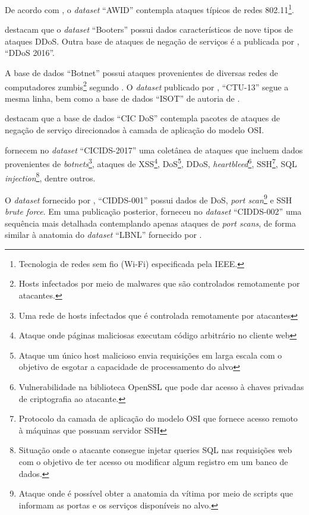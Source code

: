 De acordo com , o \textit{dataset} ``AWID'' contempla ataques típicos de redes 802.11\footnote{Tecnologia de redes sem fio (Wi-Fi) especificada pela IEEE.}.

 destacam que o \textit{dataset} ``Booters'' possui dados característicos de nove tipos de ataques DDoS. Outra base de ataques de negação de serviços é a publicada por , ``DDoS 2016''.

A base de dados ``Botnet'' possui ataques provenientes de diversas redes de computadores zumbis\footnote{Hosts infectados por meio de malwares que são controlados remotamente por atacantes.} segundo . O \textit{dataset} publicado por , ``CTU-13'' segue a mesma linha, bem como a base de dados ``ISOT'' de autoria de .

 destacam que a base de dados ``CIC DoS'' contempla pacotes de ataques de negação de serviço direcionados à camada de aplicação do modelo OSI.  

 fornecem no \textit{dataset} ``CICIDS-2017'' uma coletânea de ataques que incluem dados provenientes de \textit{botnets}\footnote{Uma rede de hosts infectados que é controlada remotamente por atacantes}, ataques de XSS\footnote{Ataque onde páginas maliciosas executam código arbitrário no cliente web}, DoS\footnote{Ataque um único host malicioso envia requisições em larga escala com o objetivo de esgotar a capacidade de processamento do alvo}, DDoS, \textit{heartbleed}\footnote{Vulnerabilidade na biblioteca OpenSSL que pode dar acesso à chaves privadas de criptografia ao atacante.}, SSH\footnote{Protocolo da camada de aplicação do modelo OSI que fornece acesso remoto à máquinas que possuam servidor SSH}, SQL \textit{injection}\footnote{Situação onde o atacante consegue injetar queries SQL nas requisições web com o objetivo de ter acesso ou modificar algum registro em um banco de dados.}, dentre outros.

O \textit{dataset} fornecido por , ``CIDDS-001'' possui dados de DoS, \textit{port scan}\footnote{Ataque onde é possível obter a anatomia da vítima por meio de scripts que informam as portas e os serviços disponíveis no alvo.} e SSH \textit{brute force}. Em uma publicação posterior,  forneceu no \textit{dataset} ``CIDDS-002'' uma sequência mais detalhada contemplando apenas ataques de \textit{port scans}, de forma similar à anatomia do \textit{dataset} ``LBNL'' fornecido por .

